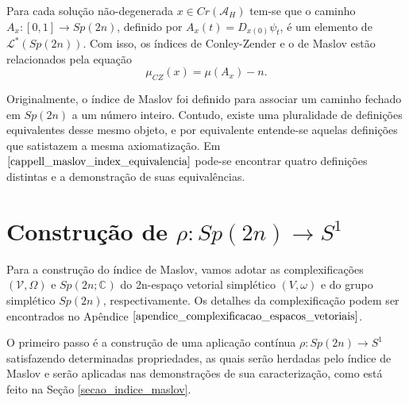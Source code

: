 \documentclass[12pt]{book}
\newcommand{\caminhosespeciais}[1]{\mathcal{L}^{*}(#1)}
\newcommand{\circulo}{S^{1}}
\newcommand{\complexificado}[1]{\mathcal{#1}}
\newcommand{\complexo}[1]{\mathbb{C}^{#1}}
\newcommand{\funcionalH}{\mathcal{A}_{H}}
\newcommand{\gruposimpletico}[1]{Sp(#1)}
\newcommand{\gruposimpleticocomplexo}[1]{Sp(#1; \complexo{})}
\newcommand{\iconley}[1]{\iconleyabrev(#1)}
\newcommand{\iconleyabrev}{\mu_{CZ}}
\newcommand{\intervalo}{[0,1]}
\newcommand{\pontoscriticos}[1]{\textit{Cr}(#1)}
\begin{document}
	Para cada solução não-degenerada $x \in \pontoscriticos{\funcionalH}$ tem-se que o caminho $A_{x}:\intervalo \to \gruposimpletico{2n}$, definido por $A_{x}(t) = D_{x(0)}\psi_{t} $, é um elemento de $\caminhosespeciais{\gruposimpletico{2n}}$. Com isso, os índices de Conley-Zender e o de Maslov estão relacionados pela equação
	$$
	\iconley{x} = \mu(A_{x})-n.
	$$
	
	Originalmente, o índice de Maslov foi definido para associar um caminho fechado em $\gruposimpletico{2n} $ a um número inteiro. Contudo, existe uma pluralidade de definições equivalentes desse mesmo objeto, e por equivalente entende-se aquelas definições que satistazem a mesma axiomatização. Em $\cite{cappell_maslov_index_equivalencia}$ pode-se encontrar quatro definições distintas e a demonstração de suas equivalências.
	
	
	\section{Construção de $\rho: \gruposimpletico{2n} \to \circulo$}
	Para a construção do índice de Maslov, vamos adotar as complexificações $(\complexificado{V}, \Omega) $ e $\gruposimpleticocomplexo{2n}$ do 2n-espaço vetorial simplético $(V, \omega)$ e do grupo simplético $\gruposimpletico{2n}$, respectivamente. Os detalhes da complexificação podem ser encontrados no Apêndice $\ref{apendice_complexificacao_espacos_vetoriais}$. 
	
	O primeiro passo é a construção de uma aplicação contínua $\rho: \gruposimpletico{2n}\to \circulo$ satisfazendo determinadas propriedades, as quais serão herdadas pelo índice de Maslov e serão aplicadas nas demonstrações de sua caracterização, como está feito na Seção \ref{secao_indice_maslov}.
	
\end{document}
